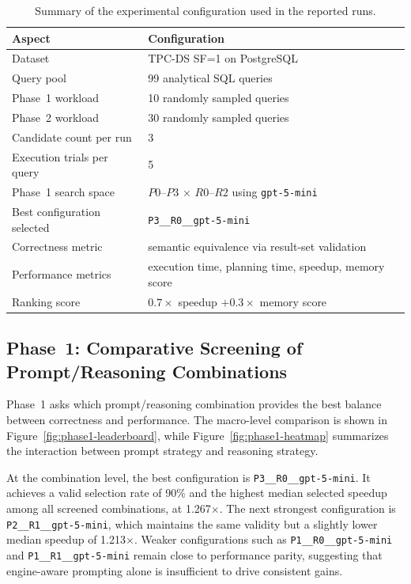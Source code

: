 \begin{table}[htbp]
\centering
\caption{Summary of the experimental configuration used in the reported runs.}
\label{tab:exp-setup}
\begin{tabular}{|l|l|}
\textbf{Aspect} & \textbf{Configuration} \\
\hline
Dataset & TPC-DS SF=1 on PostgreSQL \\
Query pool & 99 analytical SQL queries \\
Phase~1 workload & 10 randomly sampled queries \\
Phase~2 workload & 30 randomly sampled queries \\
Candidate count per run & 3 \\
Execution trials per query & 5 \\
Phase~1 search space & $P0$--$P3$ $\times$ $R0$--$R2$ using \texttt{gpt-5-mini} \\
Best configuration selected & \texttt{P3\_\_R0\_\_gpt-5-mini} \\
Correctness metric & semantic equivalence via result-set validation \\
Performance metrics & execution time, planning time, speedup, memory score \\
Ranking score & $0.7 \times$ speedup $+ 0.3 \times$ memory score \\
\hline
\end{tabular}
\end{table}

\subsection{Phase~1: Comparative Screening of Prompt/Reasoning Combinations}

Phase~1 asks which prompt/reasoning combination provides the best balance between correctness and performance. The macro-level comparison is shown in Figure~\ref{fig:phase1-leaderboard}, while Figure~\ref{fig:phase1-heatmap} summarizes the interaction between prompt strategy and reasoning strategy.

At the combination level, the best configuration is \texttt{P3\_\_R0\_\_gpt-5-mini}. It achieves a valid selection rate of 90\% and the highest median selected speedup among all screened combinations, at 1.267$\times$. The next strongest configuration is \texttt{P2\_\_R1\_\_gpt-5-mini}, which maintains the same validity but a slightly lower median speedup of 1.213$\times$. Weaker configurations such as \texttt{P1\_\_R0\_\_gpt-5-mini} and \texttt{P1\_\_R1\_\_gpt-5-mini} remain close to performance parity, suggesting that engine-aware prompting alone is insufficient to drive consistent gains.

